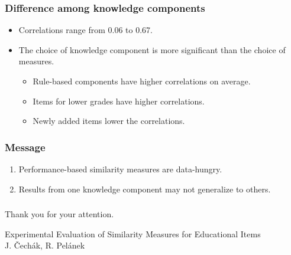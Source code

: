 \documentclass[bigger, aspectratio=169]{beamer}
\begin{document}
\begin{frame}
	\frametitle{Difference among knowledge components}
	\begin{itemize}
		\item Correlations range from 0.06 to 0.67.
		\item The choice of knowledge component is more significant than the choice of measures.
		\begin{itemize}
			\item Rule-based components have higher correlations on average.
			\item Items for lower grades have higher correlations.
			\item Newly added items lower the correlations. 
		\end{itemize}
	\end{itemize}
\end{frame}

\begin{frame}
\frametitle{Message}
\begin{enumerate}
\item Performance-based similarity measures are data-hungry.
\bigskip
\item Results from one knowledge component may not generalize to others.
\end{enumerate}
\end{frame}

\begin{frame}[standout]
	\frametitle{}
	\begin{center}
		Thank you for your attention.
	\end{center}
	\vfill
	{
		\raggedright
		\footnotesize
		Experimental Evaluation of Similarity Measures for Educational Items\\
		J. Čechák, R. Pelánek
		
	}

\end{frame}
\end{document}
